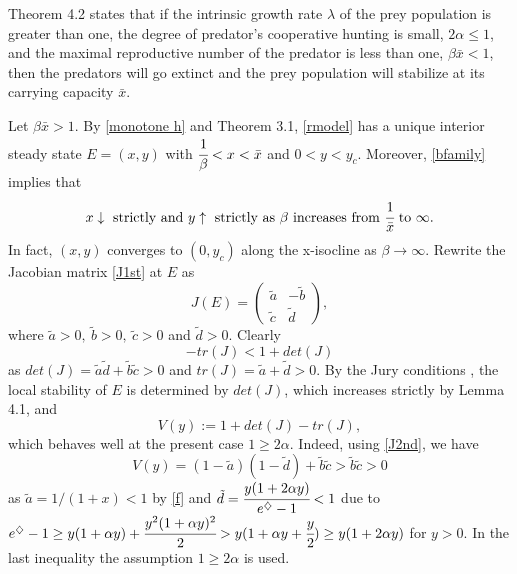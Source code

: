 \documentclass[11pt]{article}
\begin{document}
\medskip

Theorem 4.2 states that if the intrinsic growth rate $\lambda$ of
the prey population is greater than one, the degree of predator's
cooperative hunting is small, $2\alpha\leq 1$, and the maximal
reproductive number of the predator  is less than one, $\beta \bar
x<1$, then the predators will go extinct and the prey population
will stabilize at its carrying capacity $\bar x$.


Let $\beta \bar x>1$. By \eqref{monotone h} and Theorem 3.1,
\eqref{rmodel} has a unique interior steady state $E=(x, y)$ with
$\cfrac{1}{\beta }<x<\bar x$ and $0<y<y_c$. Moreover,
\eqref{bfamily} implies that
\begin{equation}\label{b_monotone}
x \downarrow \mbox{ strictly  and } y \uparrow \mbox{ strictly as
} \beta \mbox{ increases  from }  \cfrac{1}{\bar x} \mbox{ to }
\infty.
\end{equation}
In fact, $(x,y)$ converges to $(0,y_c)$ along the x-isocline as $ \beta \to   \infty$.
Rewrite the Jacobian matrix \eqref{J1st} at $E$ as
\begin{equation}\label{J2nd}
J(E )=\left(\begin{array} {cc} \tilde a & -\tilde b \\[1ex]
\tilde c & \tilde d
\end{array}
\right),
\end{equation}
where $\tilde a>0, \ \tilde b>0, \ \tilde
c>0$ and $\tilde d>0$. Clearly
\begin{equation}\label{Jury}
-tr(J)< 1+det(J)
\end{equation}
as $det(J)=\tilde a \tilde d +\tilde b \tilde c  >0$ and $tr(J)= \tilde
a  + \tilde d >0$. By the Jury
conditions \cite{allen}, the local stability of $E$ is determined by
 $det(J)$, which increases strictly by Lemma 4.1, and
 \begin{equation}\label{V}
V(y):=1+det(J)-tr(J),
\end{equation}
which behaves well at the present case $1\geq 2\alpha$. Indeed,
using \eqref{J2nd}, we have
\begin{equation}\label{V1}
V(y)=(1-\tilde a)(1-\tilde d)+\tilde b\tilde c > \tilde b\tilde c >0
\end{equation}
as $\tilde a=1/(1+x)<1$ by \eqref{f} and $\tilde
d=\cfrac{y(1+2\alpha y)}{e^{\diamondsuit}-1} < 1$ due to
$e^{\diamondsuit}-1\geq y(1+\alpha y)+\cfrac{y^2(1+\alpha
y)^2}{2}> y(1+\alpha y+\cfrac{y}{2})\geq y(1+2\alpha y)$ for
$y>0$. In the last inequality the assumption $1\geq 2\alpha$ is
used.
\end{document}
